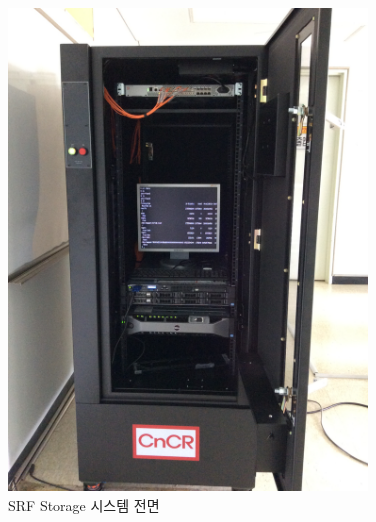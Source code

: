 \documentclass[11pt
  , a4paper
  , article
  , oneside
]{memoir}
\begin{document}
\begin{figure}[h!]
	\centering
	\includegraphics[width=0.85\textwidth]{./images/srfdb_fore.eps}
	\caption{SRF Storage 시스템 전면}
	\label{fig:srfdb_fore} 
\end{figure}


\clearpage



\end{document}
